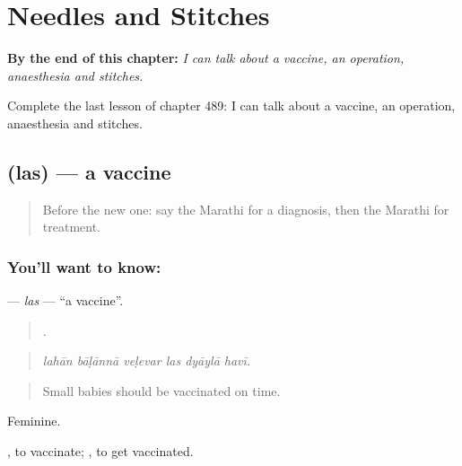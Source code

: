 
\chapter{Needles and Stitches}
\label{ch:mr-needles-and-stitches}

\begin{chapteropening}
\textbf{By the end of this chapter:} \emph{I can talk about a vaccine, an operation, anaesthesia and stitches.}

Complete the last lesson of chapter 489: I can talk about a vaccine, an operation, anaesthesia and stitches.
\end{chapteropening}

\section[\texorpdfstring{\mr{लस} (las)}{लस (las)}]{ (las) — a vaccine}

\label{lesson:MR-C489-las}



\begin{quote}
Before the new one: say the Marathi for a diagnosis, then the Marathi for treatment.
\end{quote}

\subsection*{You'll want to know: }
\textbf{} — \emph{las} — \textquotedblleft{}a vaccine\textquotedblright{}.

\begin{quote}
     .
\end{quote}

\begin{quote}
\emph{lahān bāḷānnā veḷevar las dyāylā havī.}
\end{quote}

\begin{quote}
Small babies should be vaccinated on time.
\end{quote}

Feminine.

 , to vaccinate;  , to get vaccinated.

